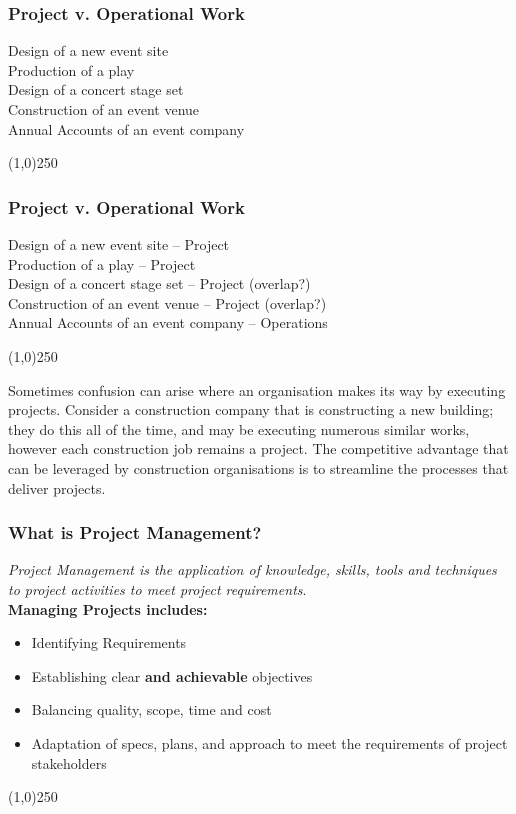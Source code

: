 \begin{frame}
\frametitle{Project v. Operational Work}
Design of a new event site\\
Production of a play\\
Design of a concert stage set\\
Construction of an event venue\\
Annual Accounts of an event company\\
\end{frame}
\begin{center}\line(1,0){250}\end{center}



\begin{frame}
\frametitle{Project v. Operational Work}
Design of a new event site -- Project\\
Production of a play -- Project \\
Design of a concert stage set -- Project (overlap?)\\
Construction of an event venue -- Project (overlap?)\\
Annual Accounts of an event company -- Operations\\
\end{frame}
\begin{center}\line(1,0){250}\end{center}
Sometimes confusion can arise where an organisation makes its way by executing projects.  Consider a construction company that is constructing a new building; they do this all of the time, and may be executing numerous similar works, however each construction job remains a project.  The competitive advantage that can be leveraged by construction organisations is to streamline the processes that deliver projects.  




\begin{frame}
\frametitle{What is Project Management?}
\textit{Project Management is the application of knowledge, skills, tools and techniques to project activities to meet project requirements}.\\
\textbf{Managing Projects includes:}\\
\begin{itemize}
	\item Identifying Requirements
	\item Establishing clear \textbf{and achievable} objectives
	\item Balancing quality, scope, time and cost
	\item Adaptation of specs, plans, and approach to meet the requirements of project stakeholders
\end{itemize}
\end{frame}
\begin{center}\line(1,0){250}\end{center}




